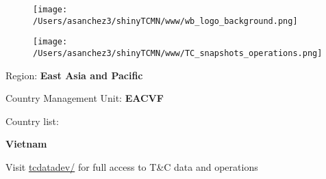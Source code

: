 \documentclass{article}\usepackage[]{graphicx}\usepackage[]{color}
\begin{document}
\begin{figure}
  \vspace{-3ex} %
  \hspace{-7ex} %
  \texttt{[image: /Users/asanchez3/shinyTCMN/www/wb\_logo\_background.png]}
\end{figure}
\begin{figure}
  \begin{minipage}[t]{0.99\textwidth} %
      \vspace{-30ex}
      \hspace{-2ex}
      \raggedright{\texttt{[image: /Users/asanchez3/shinyTCMN/www/TC\_snapshots\_operations.png]}}
  \end{minipage}
\end{figure}

\vspace{2ex}
\raggedright{\Large Region: \color{white!30!blue} \textbf{\Large East Asia and Pacific}}

\vspace{2ex}
\raggedright{\Large Country Management Unit: \color{white!30!blue} \textbf{EACVF}}

\vspace{2ex}
\raggedright{\Large Country list:}  

\vspace{2ex}

\raggedright{\textbf{\Large \color{white!30!blue}Vietnam\\
 }}

\vspace{10ex}
\raggedright{\large Visit \href{http://tcdatadev/}{\Large tcdatadev/} for full access to T\&C data and operations}

%
\end{document}
